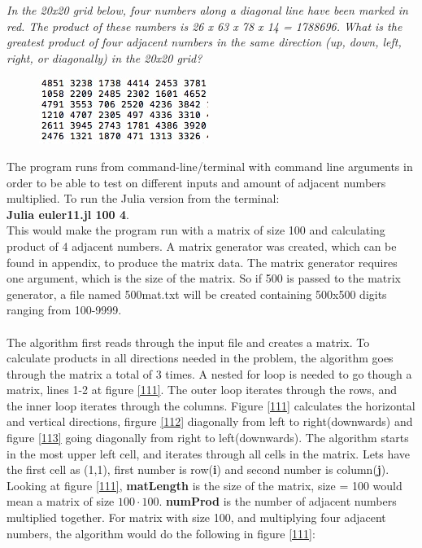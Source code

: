 \documentclass[a4paper, 11pt, titlepage]{article}
\begin{document}
\textit{In the 20x20 grid below, four numbers along a diagonal line have been marked in red. The product of these numbers is 26 x 63 x 78 x 14 = 1788696. What is the greatest product of four adjacent numbers in the same direction (up, down, left, right, or diagonally) in the 20x20 grid?}
\begin{figure}[H]
	\begin{center}
	\includegraphics[scale=0.80]{11.jpg}
	\label{11}
	\end{center}
\end{figure}
The program runs from command-line/terminal with command line arguments in order to be able to test on different inputs and amount of adjacent numbers multiplied. To run the Julia version from the terminal: \\
\textbf{Julia euler11.jl 100 4}. \\
This would make the program run with a matrix of size 100 and calculating product of 4 adjacent numbers. A matrix generator was created, which can be found in appendix, to produce the matrix data. The matrix generator requires one argument, which is the size of the matrix. So if 500 is passed to the matrix generator, a file named 500mat.txt will be created containing 500x500 digits ranging from 100-9999.\\
\\
The algorithm first reads through the input file and creates a matrix. To calculate products in all directions needed in the problem, the algorithm goes through the matrix a total of 3 times. A nested for loop is needed to go though a matrix, lines 1-2 at figure \ref{111}. The outer loop iterates through the rows, and the inner loop iterates through the columns. Figure \ref{111} calculates the horizontal and vertical directions, firgure \ref{112} diagonally from left to right(downwards) and figure \ref{113} going diagonally from right to left(downwards). The algorithm starts in the most upper left cell, and iterates through all cells in the matrix. Lets have the first cell as (1,1), first number is row(\textbf{i}) and second number is column(\textbf{j}). Looking at figure \ref{111}, \textbf{matLength} is the size of the matrix, size = 100 would mean a matrix of size $100 \cdot 100$. \textbf{numProd} is the number of adjacent numbers multiplied together. For matrix with size 100, and multiplying four adjacent numbers, the algorithm would do the following in figure \ref{111}: 
\end{document}
